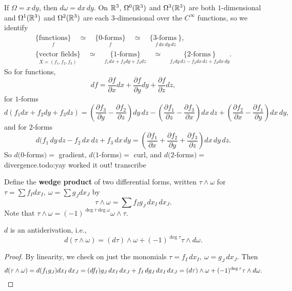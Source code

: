 \begin{example}
    If $\Omega=x\, dy$, then $d\omega=dx\,dy$. On $\mathbb{R}^3$, $\Omega^0(\mathbb{R}^3)$ and $\Omega^3(\mathbb{R}^3)$ are both $1$-dimensional and $\Omega^1(\mathbb{R}^3)$ and $\Omega^2(\mathbb{R}^3)$ are each $3$-dimensional over the $C^{\infty}$ functions, so we identify 
    \begin{gather*}
   \underset{f}{ \{\text{functions} \} } \quad \simeq \quad \underset{f}{\{0\text{-forms} \}}  \quad \simeq \quad \underset{f\,dx\,dy\,dz}{\{3\text{-forms} \ \} 
}  ,   \\
\underset{X=(f_1,f_2,f_3)}{ \{\text{vector fields} \} } \quad \simeq \quad \underset{f_1dx+f_2dy+f_3dz}{\{1\text{-forms} \}}  \quad \simeq \quad \underset{f_1dy\,dz-f_2dx\,dz+f_3dx\,dy}{\{2\text{-forms} \ \} 
}  .
    \end{gather*}So for functions, \[
    df= \frac{\partial f}{\partial x}dx+\frac{\partial f}{\partial y}dy+\frac{\partial f}{\partial z}dz,
    \] for $1$-forms \[
    d(f_1dx+f_2dy+f_3dz)=\left( \frac{\partial f_3}{\partial y}-\frac{\partial f_2}{\partial z} \right) dy\,dz-\left( \frac{\partial f_1}{\partial z}-\frac{\partial f_3}{\partial x} \right) dx\,dz+\left( \frac{\partial f_2}{\partial x}-\frac{\partial f_1}{\partial y} \right) dx\,dy,
    \] and for $2$-forms \[
    d(f_1\,dy\,dz-f_2\,dx\,dz+f_3\,dx\,dy=\left( \frac{\partial f_1}{\partial x}+\frac{\partial f_2}{\partial y}+\frac{\partial f_3}{\partial z} \right) dx\,dy\,dz.
\] So $d(0$-forms$)=$ gradient, $d(1$-forms$)=$ curl, and $d(2$-forms$)=$ divergence.{\color{red}todo:yay worked it out! transcribe} 
\end{example}
\begin{definition}[]
    Define the \textbf{wedge product} of two differential forms, written $\tau \wedge \omega$ for $\tau= \sum f_I dx_I,\ \omega=\sum g_J dx_J$ by \[
    \tau \wedge \omega=\sum f_I g_J \,dx_I \,dx_J.
\] Note that $\tau \wedge \omega=(-1)^{\deg \tau \deg \omega}\omega \wedge \tau$.
\end{definition}
\begin{prop}
    $d$ is an antiderivation, i.e., \[
        d(\tau \wedge \omega)=(d\tau )\wedge \omega +(-1)^{\deg \tau }\tau \wedge d\omega.
    \] 
\end{prop}
\begin{proof}
    By linearity, we check on just the monomials $\tau=f_I\,dx_I,\ \omega=g_J \,dx_J$. Then \[
        d(\tau \wedge \omega)=d(f_1g_J)dx_I\,dx_J=(df_I)g_J\, dx_I\,dx_J+f_I\,dg_J\,dx_I\,dx_J=(d\tau)\wedge \omega+(-1)^{\deg \tau}\tau \wedge d\omega.\qedhere
    \] 
\end{proof}
